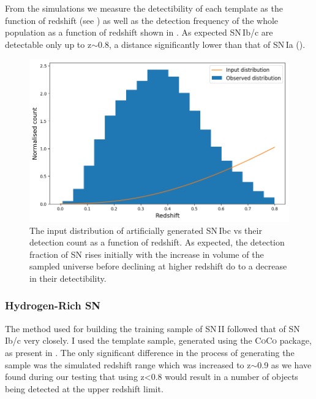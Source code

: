 From the simulations we measure the detectibility of each template as the function of redshift (see ) as well as the detection frequency of the whole population as a function of redshift shown in . As expected SN\,Ib/c are detectable only up to z$\sim$0.8, a distance significantly lower than that of SN\,Ia ().

\begin{figure}
  \includegraphics[width=\textwidth]{Figures/Chapter5/SNIbc_z_dist.png}
  \caption{The input distribution of artificially generated SN\,Ibc vs their detection count as a function of redshift. As expected, the detection fraction of SN rises initially with the increase in volume of the sampled universe before declining at higher redshift do to a decrease in their detectibility.}
  \label{fig:IbcDist}
\end{figure}

\subsubsection{Hydrogen-Rich SN}
The method used for building the training sample of SN\,II followed that of SN\,Ib/c very closely. I used the template sample, generated using the \textsc{CoCo} package, as present in . The only significant difference in the process of generating the sample was the simulated redshift range which was increased to z$\sim$0.9 as we have found during our testing that using z<0.8 would result in a number of objects being detected at the upper redshift limit.

